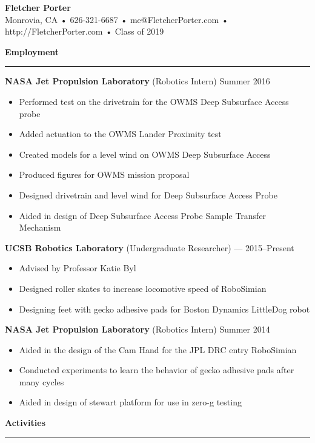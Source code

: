 \documentclass[12pt, oneside]{article}
\newcommand{\titlestyle}[1] {
	{\fontsize{50pt}{1em}\selectfont \bf \textcolor{new_red}{#1}} \\
}
\newcommand{\headingstyleJobs}[1] {
	{\fontsize{20pt}{1em}\selectfont \bf \textcolor{new_red}{#1}}
	\textcolor{new_red}{\rule{3.25in}{0.5pt}} \vspace{3pt}
}
\newcommand{\infostyle}[1] {
	{\fontsize{10pt}{1em}\selectfont #1} \\ \vspace{9pt}
}
\newcommand{\jobtitle}[2] {
	{\bf #1} {#2} \vspace{-10pt} \\
}
\begin{document}
\begin{flushleft}


\titlestyle{Fletcher Porter}
\infostyle{Monrovia, CA • 626-321-6687 • me@FletcherPorter.com • http://FletcherPorter.com • Class of 2019}

\headingstyleJobs{Employment}

\jobtitle{NASA Jet Propulsion Laboratory}{(Robotics Intern) Summer 2016}
\begin{itemize}
	\item Performed test on the drivetrain for the OWMS Deep Subsurface Access probe
	\item Added actuation to the OWMS Lander Proximity test
	\item Created models for a level wind on OWMS Deep Subsurface Access
	\item Produced figures for OWMS mission proposal
	\item Designed drivetrain and level wind for Deep Subsurface Access Probe
	\item Aided in design of Deep Subsurface Access Probe Sample Transfer Mechanism
\end{itemize}

\jobtitle{UCSB Robotics Laboratory}{(Undergraduate Researcher) — 2015–Present}
\begin{itemize}
	\item Advised by Professor Katie Byl
	\item Designed roller skates to increase locomotive speed of RoboSimian
	\item Designing feet with gecko adhesive pads for Boston Dynamics LittleDog robot
\end{itemize}

\jobtitle{NASA Jet Propulsion Laboratory}{(Robotics Intern) Summer 2014}
\begin{itemize}
	\item Aided in the design of the Cam Hand for the JPL DRC entry RoboSimian
	\item Conducted experiments to learn the behavior of gecko adhesive pads after many cycles
	\item Aided in design of stewart platform for use in zero-g testing
\end{itemize}


\headingstyleJobs{Activities}


\end{flushleft}
\end{document}
